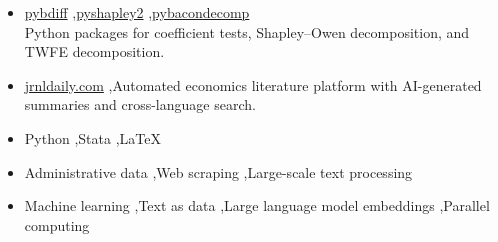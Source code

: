 \documentclass[a4paper,10pt]{article}
\begin{document}

\begin{itemize}[itemsep=0.35em, topsep=0.5em]

\item \href{https://pypi.org/project/pybdiff/}{pybdiff} \sep \href{https://pypi.org/project/pyshapley2/}{pyshapley2} \sep \href{https://pypi.org/project/pybacondecomp/}{pybacondecomp}\\
  Python packages for coefficient tests, Shapley--Owen decomposition, and TWFE decomposition.

\item \href{https://jrnldaily.com}{jrnldaily.com} \sep Automated economics literature platform with AI-generated summaries and cross-language search.

\end{itemize}


\begin{itemize}[itemsep=0.25em, topsep=0.5em]
\item {} Python \sep Stata \sep LaTeX
\item {} Administrative data \sep Web scraping \sep Large-scale text processing
\item {} Machine learning \sep Text as data \sep Large language model embeddings \sep Parallel computing
\end{itemize}

\bigskip
\noindent{\footnotesize\textcolor{gray}{This version: November 2026}}
\end{document}

